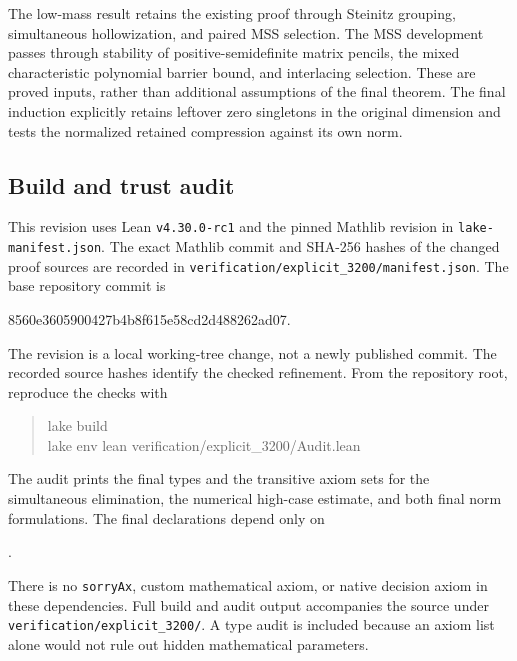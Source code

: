 \documentclass[11pt]{article}
\theoremstyle{remark}
\numberwithin{equation}{section}
\begin{document}
The low-mass result retains the existing proof through Steinitz grouping,
simultaneous hollowization, and paired MSS selection. The MSS development
passes through stability of positive-semidefinite matrix pencils, the mixed
characteristic polynomial barrier bound, and interlacing selection. These
are proved inputs, rather than additional assumptions of the final theorem.
The final induction explicitly retains leftover zero singletons in the
original dimension and tests the normalized retained compression against
its own norm.

\subsection{Build and trust audit}
This revision uses Lean \texttt{v4.30.0-rc1} and the pinned Mathlib revision
in \texttt{lake-manifest.json}. The exact Mathlib commit and SHA-256 hashes
of the changed proof sources are recorded in
\texttt{verification/explicit\_3200/manifest.json}.
The base repository commit is
\begin{center}\small\ttfamily
8560e3605900427b4b8f615e58cd2d488262ad07.
\end{center}
The revision is a local working-tree change, not a newly published commit.
The recorded source hashes identify the checked refinement. From the
repository root, reproduce the checks with
\begin{quote}\small\ttfamily
lake build\\
lake env lean verification/explicit\_3200/Audit.lean
\end{quote}
The audit prints the final types and the transitive axiom sets for the
simultaneous elimination, the numerical high-case estimate, and both final
norm formulations. The final declarations depend only on
\begin{center}.
\end{center}
There is no \texttt{sorryAx}, custom mathematical axiom, or native decision
axiom in these dependencies. Full build and audit output accompanies the
source under \texttt{verification/explicit\_3200/}. A type audit is included
because an axiom list alone would not rule out hidden mathematical parameters.
\end{document}
